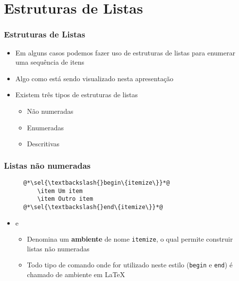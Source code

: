 \section{Estruturas de Listas}

\begin{frame}[fragile] \frametitle{Estruturas de Listas}
\begin{itemize}
	\item Em alguns casos podemos fazer uso de estruturas de listas para enumerar uma sequência de itens
	\item Algo como está sendo visualizado nesta apresentação
	\item Existem três tipos de estruturas de listas
	\begin{itemize}
		\item Não numeradas
		\item Enumeradas
		\item Descritivas
	\end{itemize}
\end{itemize}
\end{frame}

\begin{frame}[fragile] \frametitle{Listas não numeradas}
\begin{figure}[!t]
\begin{lstlisting}
@*\sel{\textbackslash{}begin\{itemize\}}*@
	\item Um item
	\item Outro item
@*\sel{\textbackslash{}end\{itemize\}}*@
\end{lstlisting}
\end{figure}

\begin{itemize}
	\item {} e 
	\begin{itemize}
		\item Denomina um \textbf{ambiente} de nome \texttt{itemize}, o qual permite construir listas não numeradas
		\item Todo tipo de comando onde for utilizado neste estilo (\texttt{begin} e \texttt{end}) é chamado de ambiente em LaTeX
	\end{itemize}
\end{itemize}
\end{frame}

